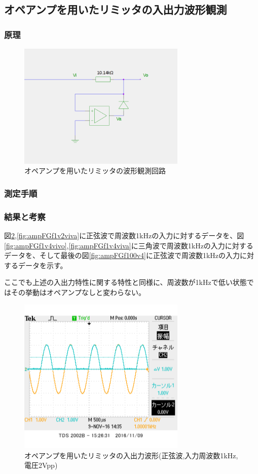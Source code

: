 \documentclass[11pt,a4j]{jsarticle}
\begin{document}
    
  \subsection{オペアンプを用いたリミッタの入出力波形観測}
   \subsubsection{原理}
    
    \begin{figure}[htbp]
  \centering
  \includegraphics[width=8cm,clip]{amp_wave.png}
  \caption{オペアンプを用いたリミッタの波形観測回路}
  \label{fig:amp_wave}
 \end{figure}%
    
   \subsubsection{測定手順}
    
    
   \subsubsection{結果と考察}
    図\ref{fig:ampFGf1v2vivo},\ref{fig:ampFGf1v2viva}に正弦波で周波数1kHzの入力に対するデータを、図\ref{fig:ampFGf1v4vivo},\ref{fig:ampFGf1v4viva}に三角波で周波数1kHzの入力に対するデータを、そして最後の図\ref{fig:ampFGf100v4}に正弦波で周波数1kHzの入力に対するデータを示す。
    
    ここでも上述の入出力特性に関する特性と同様に、周波数が1kHzで低い状態ではその挙動はオペアンプなしと変わらない。
    
    \begin{figure}[htbp]
  \centering
  \includegraphics[width=8cm,clip]{1_1_ampFG_f1V2_ViVo.png}
  \caption{オペアンプを用いたリミッタの入出力波形(正弦波,入力周波数1kHz,電圧2Vpp)}
  \label{fig:ampFGf1v2vivo}
 \end{figure}%
 
\end{document}
